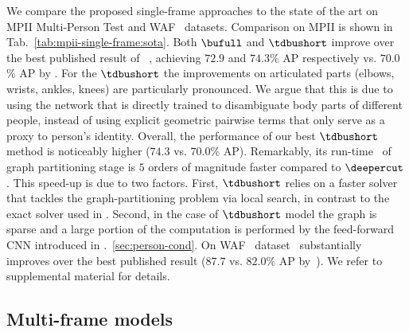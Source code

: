  


 We compare the
proposed single-frame approaches to the state of the art on MPII
Multi-Person Test and WAF~\cite{eichner10eccv} datasets. Comparison on
MPII is shown in Tab.~\ref{tab:mpii-single-frame:sota}. Both $\bufull$
and $\tdbushort$ improve over the best published result of
\deepercut{}~\cite{insafutdinov16arxiv}, achieving $72.9$ and $74.3$\%
AP respectively vs. $70.0$\% AP by \deepercut{}. For the $\tdbushort$
the improvements on articulated parts (elbows, wrists, ankles, knees)
are particularly pronounced. We argue that this is due to using the network
that is directly trained to disambiguate body parts of different
people, instead of using explicit geometric pairwise terms that only
serve as a proxy to person's identity. Overall, the performance of our
best $\tdbushort$ method is noticeably higher ($74.3$ vs. $70.0$\%
AP). Remarkably, its run-time \timeinfer~of graph partitioning stage is $5$ orders of magnitude
faster compared to $\deepercut$. This speed-up is due to two
factors. First, $\tdbushort$ relies on a faster solver
\cite{levinkov16arxiv} that tackles the graph-partitioning problem via
local search, in contrast to the exact solver used in
\cite{insafutdinov16eccv}. Second, in the case of $\tdbushort$ model
the graph is sparse and a large portion of the computation is
performed by the feed-forward CNN introduced in
\Sec.~\ref{sec:person-cond}. On WAF~\cite{eichner10eccv} dataset
\tdbushort~substantially improves over the best published result
($87.7$ vs. $82.0$\% AP by~\cite{insafutdinov16arxiv}). We refer to
supplemental material for details.





\subsection{Multi-frame models}

